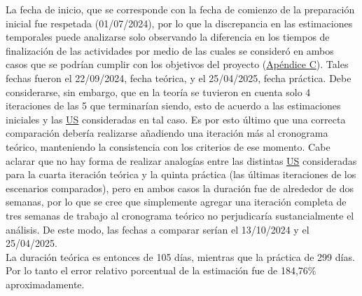 \documentclass[a4paper, 12pt,twoside]{report}  %
\numberwithin{equation}{subsection} %
\begin{document}
La fecha de inicio, que se corresponde con la fecha de comienzo de la preparación inicial fue respetada (01/07/2024), por lo que la discrepancia en las estimaciones temporales puede analizarse solo observando la diferencia en los tiempos de finalización de las actividades por medio de las cuales se consideró en ambos casos que se podrían cumplir con los objetivos del proyecto (\hyperlink{apendice_c}{Apéndice C}). Tales fechas fueron el 22/09/2024, fecha teórica, y el 25/04/2025, fecha práctica. Debe considerarse, sin embargo, que en la teoría se tuvieron en cuenta solo 4 iteraciones de las 5 que terminarían siendo, esto de acuerdo a las estimaciones iniciales y las \hyperlink{US}{US} consideradas en tal caso. Es por esto último que una correcta comparación debería realizarse añadiendo una iteración más al cronograma teórico, manteniendo la consistencia con los criterios de ese momento. Cabe aclarar que no hay forma de realizar analogías entre las distintas \hyperlink{US}{US} consideradas para la cuarta iteración teórica y la quinta práctica (las últimas iteraciones de los escenarios comparados), pero en ambos casos la duración fue de alrededor de dos semanas, por lo que se cree que simplemente agregar una iteración completa de tres semanas de trabajo al cronograma teórico no perjudicaría sustancialmente el análisis. De este modo, las fechas a comparar serían el 13/10/2024 y el 25/04/2025.\\
\indent La duración teórica es entonces de 105 días, mientras que la práctica de 299 días. Por lo tanto el error relativo porcentual de la estimación fue de 184,76\% aproximadamente.
\end{document}
